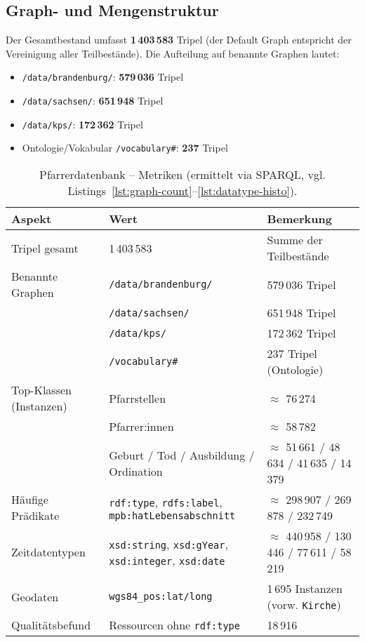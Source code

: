 \subsection*{Graph- und Mengenstruktur}
Der Gesamtbestand umfasst \textbf{1\,403\,583} Tripel (der Default Graph entspricht der Vereinigung aller Teilbestände). Die Aufteilung auf benannte Graphen lautet:
\begin{itemize}
  \item \texttt{/data/brandenburg/}: \textbf{579\,036} Tripel
  \item \texttt{/data/sachsen/}: \textbf{651\,948} Tripel
  \item \texttt{/data/kps/}: \textbf{172\,362} Tripel
  \item Ontologie/Vokabular \texttt{/vocabulary\#}: \textbf{237} Tripel
\end{itemize}

\begin{table}[h]
\centering
\begin{tabular}{lll}
\textbf{Aspekt} & \textbf{Wert} & \textbf{Bemerkung} \\
\hline
Tripel gesamt & 1\,403\,583 & Summe der Teilbestände \\
Benannte Graphen & \texttt{/data/brandenburg/} & 579\,036 Tripel \\
 & \texttt{/data/sachsen/} & 651\,948 Tripel \\
 & \texttt{/data/kps/} & 172\,362 Tripel \\
 & \texttt{/vocabulary\#} & 237 Tripel (Ontologie) \\
Top-Klassen (Instanzen) & Pfarrstellen & \(\approx\) 76\,274 \\
 & Pfarrer:innen & \(\approx\) 58\,782 \\
 & Geburt / Tod / Ausbildung / Ordination & \(\approx\) 51\,661 / 48\,634 / 41\,635 / 14\,379 \\
Häufige Prädikate & \texttt{rdf:type}, \texttt{rdfs:label}, \texttt{mpb:hatLebensabschnitt} & \(\approx\) 298\,907 / 269\,878 / 232\,749 \\
Zeitdatentypen & \texttt{xsd:string}, \texttt{xsd:gYear}, \texttt{xsd:integer}, \texttt{xsd:date} & \(\approx\) 440\,958 / 130\,446 / 77\,611 / 58\,219 \\
Geodaten & \texttt{wgs84\_pos:lat/long} & 1\,695 Instanzen (vorw. \texttt{Kirche}) \\
Qualitätsbefund & Ressourcen ohne \texttt{rdf:type} & 18\,916 \\
\end{tabular}
\caption{Pfarrerdatenbank – Metriken (ermittelt via SPARQL, vgl. Listings~\ref{lst:graph-count}–\ref{lst:datatype-histo}).}
\label{tab:pfarrerbuch-metriken}
\end{table}

